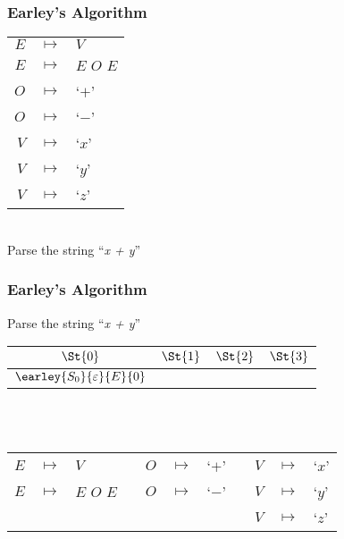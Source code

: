 \begin{frame}
	\frametitle{Earley's Algorithm}
	\centering
	\begin{tabular}{rcl}
		$E$ & $ \mapsto $ & $V$ \\
		$E$ & $ \mapsto $ & $E$ $O$ $E$ \\
		$O$ & $ \mapsto $ & `$+$' \\
		$O$ & $ \mapsto $ & `$-$' \\
		$V$ & $ \mapsto $ & `$x$' \\
		$V$ & $ \mapsto $ & `$y$' \\
		$V$ & $ \mapsto $ & `$z$'
	\end{tabular} \\ \vspace{1cm}
	Parse the string ``\emph{x + y}''
\end{frame}

\begin{frame}
	\frametitle{Earley's Algorithm}
	\centering
	Parse the string ``\emph{x + y}''\\
	\vspace{0.5cm}
	\begin{tabular}{|c|c|c|c|}
		\hline
		$\St{0}$ & $\St{1}$ & $\St{2}$ & $\St{3}$ \\
		\hline
		$\earley{S_0}{\varepsilon}{E}{0}$ & & & \\
		\hline
	\end{tabular}

	\\~\\
	\vspace{0.5cm}
	\scriptsize
	\begin{tabular}{rclcrclcrcl}
		$E$ & $ \mapsto $ & $V$         && $O$ & $ \mapsto $ & `$+$' && $V$ & $ \mapsto $ & `$x$' \\
		$E$ & $ \mapsto $ & $E$ $O$ $E$ && $O$ & $ \mapsto $ & `$-$' && $V$ & $ \mapsto $ & `$y$' \\
		    &             &             &&     &             &       && $V$ & $ \mapsto $ & `$z$'
	\end{tabular}
\end{frame}

